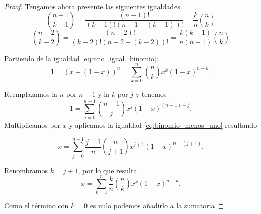 \begin{proof}


    Tengamos ahora presente las siguientes igualdades 
    \begin{equation} \label{eq:binomio_menos_uno}
        \binom{n-1}{k-1} = \frac{(n-1)!}{(k-1)! (n-1-(k-1))!} = \frac{k}{n} \binom{n}{k}
    \end{equation}
    \begin{equation} \label{eq:binomio_menos_dos}
        \binom{n-2}{k-2} = \frac{(n-2)!}{(k-2)! (n-2-(k-2))!} = \frac{k(k-1)}{n(n-1)} \binom{n}{k}
    \end{equation}

    Partiendo de la igualdad \eqref{eq:uno_igual_binomio}:
    \begin{equation}
        1 = (x+ (1-x))^n = \sum_{k=0}^n \binom{n}{k} x^{k} (1-x)^{n-k}.
    \end{equation}

    Reemplazamos la $n$ por $n-1$ y la $k$ por $j$ y tenemos 
    \begin{equation}
        1 = \sum_{j=0}^{n-1} \binom{n-1}{j} x^{j} (1-x)^{(n-1)-j}.
    \end{equation}
    Multiplicamos por $x$ y aplicamos la igualdad \eqref{eq:binomio_menos_uno} resultando 

    \begin{equation}
        x = \sum_{j=0}^{n-1} \frac{j+1}{n} \binom{n}{j+1} x^{j+1} (1-x)^{n-(j+1)}.
    \end{equation}

    Renombramos $k= j+1$, por lo que resulta
    \begin{equation}
        x = \sum_{k=1}^{n} \frac{k}{n} \binom{n}{k} x^{k} (1-x)^{n-k}.
    \end{equation}

    Como el término con $k=0$ es nulo podemos añadirlo a la sumatoria
    

\end{proof}
